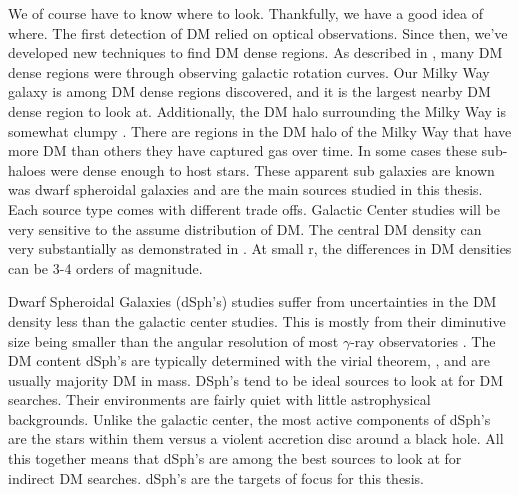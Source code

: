 \begin{figure}
\end{figure}

We of course have to know where to look.
Thankfully, we have a good idea of where.
The first detection of DM relied on optical observations.
Since then, we've developed new techniques to find DM dense regions.
As described in , many DM dense regions were through observing galactic rotation curves.
Our Milky Way galaxy is among DM dense regions discovered, and it is the largest nearby DM dense region to look at.
Additionally, the DM halo surrounding the Milky Way is somewhat clumpy \cite{Tracy:les_houches}.
There are regions in the DM halo of the Milky Way that have more DM than others they have captured gas over time.
In some cases these sub-haloes were dense enough to host stars.
These apparent sub galaxies are known was dwarf spheroidal galaxies and are the main sources studied in this thesis.
Each source type comes with different trade offs.
Galactic Center studies will be very sensitive to the assume distribution of DM.
The central DM density can very substantially as demonstrated in .
At small r, the differences in DM densities can be 3-4 orders of magnitude.

Dwarf Spheroidal Galaxies (dSph's) studies suffer from uncertainties in the DM density less than the galactic center studies.
This is mostly from their diminutive size being smaller than the angular resolution of most $\gamma$-ray observatories \cite{Tracy:les_houches}.
The DM content dSph's are typically determined with the virial theorem, , and are usually majority DM \cite{Tracy:les_houches} in mass.
DSph's tend to be ideal sources to look at for DM searches.
Their environments are fairly quiet with little astrophysical backgrounds.
Unlike the galactic center, the most active components of dSph's are the stars within them versus a violent accretion disc around a black hole.
All this together means that dSph's are among the best sources to look at for indirect DM searches.
dSph's are the targets of focus for this thesis.

